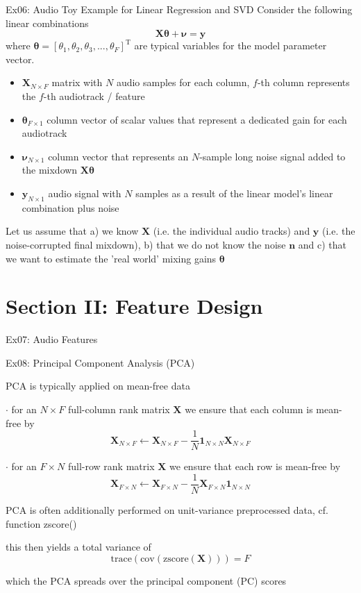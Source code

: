 \documentclass[mathserif, aspectratio=1610]{intbeamer}
\begin{document}
\begin{frame}{Ex06: Audio Toy Example for Linear Regression and SVD}
Consider the following linear combinations
$$\bm{X} \bm{\theta} + \bm{\nu} = \bm{y}$$
where $\bm{\theta}=[\theta_1, \theta_2, \theta_3, ..., \theta_{F}]^\mathrm{T}$ are typical variables for the model parameter vector.
%
\begin{itemize}
\item $\bm{X}_{N \times F}$ matrix with $N$ audio samples for each column, $f$-th column represents the $f$-th audiotrack / feature
\item $\bm{\theta}_{F \times 1}$ column vector of scalar values that represent a dedicated gain for each audiotrack
\item $\bm{\nu}_{N \times 1}$ column vector that represents an $N$-sample long noise signal added to the mixdown $\bm{X} \bm{\theta}$
\item $\bm{y}_{N \times 1}$ audio signal with $N$ samples as a result of the linear model's linear combination plus noise
\end{itemize}
%
Let us assume that a) we know $\bm{X}$ (i.e. the individual audio tracks) and $\bm{y}$ (i.e. the noise-corrupted final mixdown), b) that we do not know the noise $\bm{n}$ and c) that we want to estimate the 'real world' mixing gains $\bm{\theta}$
\end{frame}



\section{Section II: Feature Design}

\begin{frame}{Ex07: Audio Features}
\end{frame}


\begin{frame}[t]{Ex08: Principal Component Analysis (PCA)}

PCA is typically applied on mean-free data

$\cdot$ for an $N \times F$ full-column rank matrix $\bm{X}$ we ensure that each column is mean-free by
$$\bm{X}_{N \times F} \leftarrow \bm{X}_{N \times F} - \frac{1}{N} \bm{1}_{N \times N} \bm{X}_{N \times F}$$

$\cdot$ for an $F \times N$ full-row rank matrix $\bm{X}$ we ensure that each row is mean-free by
$$\bm{X}_{F \times N} \leftarrow \bm{X}_{F \times N} - \frac{1}{N} \bm{X}_{F \times N} \bm{1}_{N \times N}$$

PCA is often additionally performed on unit-variance preprocessed data, cf. function zscore()

this then yields a total variance of $$\mathrm{trace}(\mathrm{cov}(\mathrm{zscore}(\bm{X})))= F$$

which the PCA spreads over the principal component (PC) scores

\end{frame}
\end{document}
